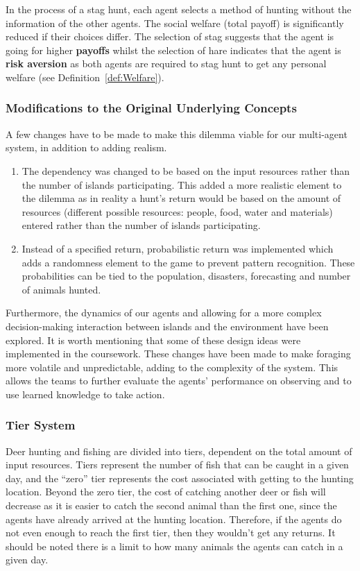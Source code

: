 In the process of a stag hunt, each agent selects a method of hunting without the information of the other agents. The social welfare (total payoff) is significantly reduced if their choices differ. The selection of stag suggests that the agent is going for higher \textbf{payoffs} whilst the selection of hare indicates that the agent is \textbf{risk aversion} as both agents are required to stag hunt to get any personal welfare (see Definition~\ref{def:Welfare}).

\subsubsection{Modifications to the Original Underlying Concepts} 
A few changes have to be made to make this dilemma viable for our multi-agent system, in addition to adding realism. 

\begin{enumerate}
    \item The dependency was changed to be based on the input resources rather than the number of islands participating. This added a more realistic element to the dilemma as in reality a hunt’s return would be based on the amount of resources (different possible resources: people, food, water and materials) entered rather than the number of islands participating.
    \item Instead of a specified return, probabilistic return was implemented which adds a randomness element to the game to prevent pattern recognition. These probabilities can be tied to the population, disasters, forecasting and number of animals hunted.  
\end{enumerate}

Furthermore, the dynamics of our agents and allowing for a more complex decision-making interaction between islands and the environment have been explored. It is worth mentioning that some of these design ideas were implemented in the coursework. These changes have been made to make foraging more volatile and unpredictable, adding to the complexity of the system. This allows the teams to further evaluate the agents’ performance on observing and to use learned knowledge to take action.

\subsubsection{Tier System}

Deer hunting and fishing are divided into tiers, dependent on the total amount of input resources. Tiers represent the number of fish that can be caught in a given day, and the “zero” tier represents the cost associated with getting to the hunting location. Beyond the zero tier, the cost of catching another deer or fish will decrease as it is easier to catch the second animal than the first one, since the agents have already arrived at the hunting location. Therefore, if the agents do not even enough to reach the first tier, then they wouldn't get any returns. It should be noted there is a limit to how many animals the agents can catch in a given day.

